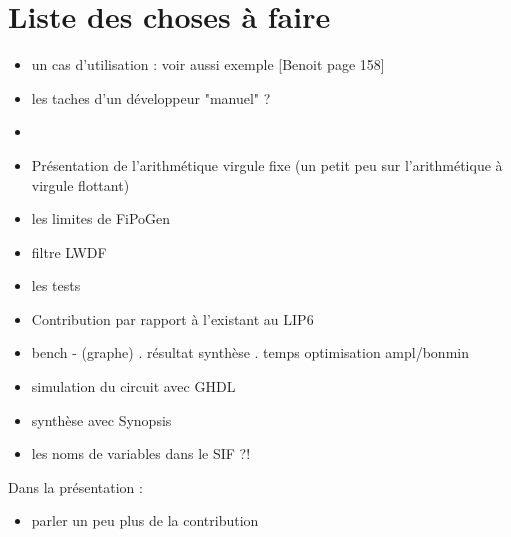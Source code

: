 \chapter{Liste des choses à faire}
\begin{itemize}
\item un cas d'utilisation : voir aussi exemple [Benoit page 158]
\item les taches d'un développeur "manuel" ?
\item
\item Présentation de l'arithmétique virgule fixe (un petit peu sur l'arithmétique à virgule flottant)

\item les limites de FiPoGen
\item filtre LWDF
\item les tests
\item Contribution par rapport à l'existant au LIP6

\item bench - (graphe) . résultat synthèse . temps optimisation ampl/bonmin

\item simulation du circuit avec GHDL
\item synthèse avec Synopsis

\item les noms de variables dans le SIF ?!
\end{itemize}




Dans la présentation : \\
\begin{itemize}
\item parler un peu plus de la contribution
\end{itemize}



